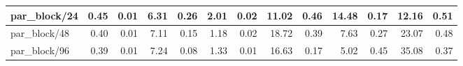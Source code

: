 \begin{table}[]
\begin{tabular}{|lllllllllllll|}
\multicolumn{1}{|l|}{par\_block/24}  & \multicolumn{1}{r|}{0.45} & \multicolumn{1}{r|}{0.01} & \multicolumn{1}{r|}{6.31} & \multicolumn{1}{r|}{0.26}  & \multicolumn{1}{r|}{2.01} & \multicolumn{1}{r|}{0.02} & \multicolumn{1}{r|}{11.02} & \multicolumn{1}{r|}{0.46}  & \multicolumn{1}{r|}{14.48} & \multicolumn{1}{r|}{0.17} & \multicolumn{1}{r|}{12.16} & \multicolumn{1}{r|}{0.51}  \\ \hline
\multicolumn{1}{|l|}{par\_block/48}  & \multicolumn{1}{r|}{0.40} & \multicolumn{1}{r|}{0.01} & \multicolumn{1}{r|}{7.11} & \multicolumn{1}{r|}{0.15}  & \multicolumn{1}{r|}{1.18} & \multicolumn{1}{r|}{0.02} & \multicolumn{1}{r|}{18.72} & \multicolumn{1}{r|}{0.39}  & \multicolumn{1}{r|}{7.63} & \multicolumn{1}{r|}{0.27} & \multicolumn{1}{r|}{23.07} & \multicolumn{1}{r|}{0.48}  \\ \hline
\multicolumn{1}{|l|}{par\_block/96}  & \multicolumn{1}{r|}{0.39} & \multicolumn{1}{r|}{0.01} & \multicolumn{1}{r|}{7.24} & \multicolumn{1}{r|}{0.08}  & \multicolumn{1}{r|}{1.33} & \multicolumn{1}{r|}{0.01} & \multicolumn{1}{r|}{16.63} & \multicolumn{1}{r|}{0.17}  & \multicolumn{1}{r|}{5.02} & \multicolumn{1}{r|}{0.45} & \multicolumn{1}{r|}{35.08} & \multicolumn{1}{r|}{0.37}  \\ \hline
\end{tabular}
\end{table}

